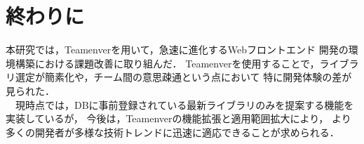 \documentclass[main]{subfiles}
\begin{document}
\section{終わりに}
本研究では，Teamenverを用いて，急速に進化するWebフロントエンド
開発の環境構築における課題改善に取り組んだ．
Teamenverを使用することで，ライブラリ選定が簡素化や，チーム間の意思疎通という点において
特に開発体験の差が見られた．\\
　現時点では，DBに事前登録されている最新ライブラリのみを提案する機能を実装しているが，
今後は，Teamenverの機能拡張と適用範囲拡大により，
より多くの開発者が多様な技術トレンドに迅速に適応できることが求められる．
\end{document}
